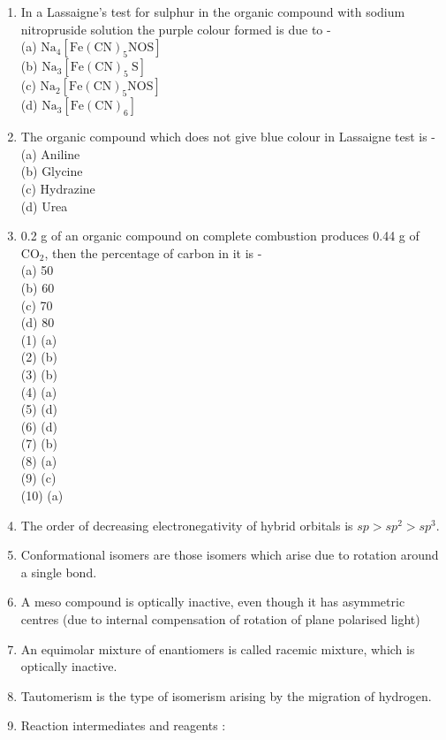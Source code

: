 \documentclass[10pt]{article}
\begin{document}
\begin{enumerate}
(a) $\mathrm{CH}_{2} \mathrm{O}$\\
(b) $\mathrm{C}_{2} \mathrm{H}_{4} \mathrm{O}_{2}$\\
(c) $\mathrm{C}_{3} \mathrm{H}_{6} \mathrm{O}_{3}$\\
(d) $\mathrm{CH}_{5} \mathrm{~N}$
  \item In a Lassaigne's test for sulphur in the organic compound with sodium nitropruside solution the purple colour formed is due to -\\
(a) $\mathrm{Na}_{4}\left[\mathrm{Fe}(\mathrm{CN})_{5} \mathrm{NOS}\right]$\\
(b) $\mathrm{Na}_{3}\left[\mathrm{Fe}(\mathrm{CN})_{5} \mathrm{~S}\right]$\\
(c) $\mathrm{Na}_{2}\left[\mathrm{Fe}(\mathrm{CN})_{5} \mathrm{NOS}\right]$\\
(d) $\mathrm{Na}_{3}\left[\mathrm{Fe}(\mathrm{CN})_{6}\right]$
  \item The organic compound which does not give blue colour in Lassaigne test is -\\
(a) Aniline\\
(b) Glycine\\
(c) Hydrazine\\
(d) Urea
  \item 0.2 g of an organic compound on complete combustion produces 0.44 g of $\mathrm{CO}_{2}$, then the percentage of carbon in it is -\\
(a) 50\\
(b) 60\\
(c) 70\\
(d) 80\\
(1) (a)\\
(2) (b)\\
(3) (b)\\
(4) (a)\\
(5) (d)\\
(6) (d)\\
(7) (b)\\
(8) (a)\\
(9) (c)\\
(10) (a)
  \item The order of decreasing electronegativity of hybrid orbitals is $s p>s p^{2}>s p^{3}$.
  \item Conformational isomers are those isomers which arise due to rotation around a single bond.
  \item A meso compound is optically inactive, even though it has asymmetric centres (due to internal compensation of rotation of plane polarised light)
  \item An equimolar mixture of enantiomers is called racemic mixture, which is optically inactive.
  \item Tautomerism is the type of isomerism arising by the migration of hydrogen.
  \item Reaction intermediates and reagents :
\end{enumerate}
\end{document}
